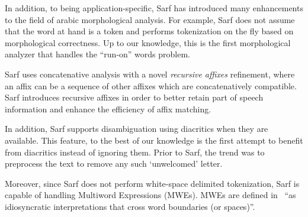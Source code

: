 \documentclass[11pt]{article}
\newcommand{\noVocRL}[1]{\transtrue\novocalize\RL{#1}\vocalize}
\begin{document}
In addition, to being application-specific, Sarf has introduced 
many enhancements to the field of arabic morphological analysis. 
For example,
Sarf does not assume that the word at hand is a token and
performs tokenization on the fly based on morphological correctness.
Up to our knowledge, this is the first morphological analyzer that 
handles the ``run-on'' words problem. 

Sarf uses concatenative analysis with a novel %
{\em recursive affixes} refinement,
where an affix can be a sequence of other affixes which are concatenatively compatible.
Sarf introduces recursive affixes in order to
better retain part of speech information and enhance the 
efficiency of affix matching. 

In addition, Sarf supports disambiguation using diacritics when they are available.
This feature, to the best of our knowledge is the first attempt to benefit from 
diacritics instead of ignoring them. Prior to Sarf, the trend was to preprocess 
the text to remove any such `unwelcomed' letter. %

Moreover, since Sarf does not perform white-space delimited tokenization, Sarf is capable of 
handling Multiword Expressions (MWEs).
MWEs are defined in~\cite{MWE}
``as idiosyncratic interpretations
that cross word boundaries (or spaces)''. 
\end{document}
